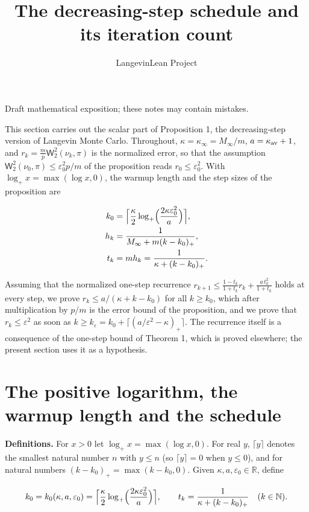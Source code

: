 \documentclass[11pt,a4paper]{article}
\title{\texorpdfstring{The decreasing-step schedule and its iteration count}{The decreasing-step schedule and its iteration count}}
\author{LangevinLean Project}
\date{}
\begin{document}
\maketitle
Draft mathematical exposition; these notes may contain mistakes.


This section carries out the scalar part of Proposition 1, the decreasing-step version of Langevin Monte Carlo. Throughout, \(\kappa=\kappa_\infty=M_\infty/m\), \(a=\kappa_{\rm av}+1\), and \(r_k=\frac mp\mathsf W_2^2(\nu_k,\pi)\) is the normalized error, so that the assumption \(\mathsf W_2^2(\nu_0,\pi)\le\varepsilon_0^2p/m\) of the proposition reads \(r_0\le\varepsilon_0^2\). With \(\log_+x=\max(\log x,0)\), the warmup length and the step sizes of the proposition are


\[\begin{aligned}
k_0&=\Bigl\lceil\frac\kappa2\log_+\Bigl(\frac{2\kappa\varepsilon_0^2}{a}\Bigr)\Bigr\rceil,\\
h_k&=\frac1{M_\infty+m(k-k_0)_+},\\
t_k&=mh_k=\frac1{\kappa+(k-k_0)_+}.
\end{aligned}\]


Assuming that the normalized one-step recurrence \(r_{k+1}\le\frac{1-t_k}{1+t_k}r_k+\frac{a\,t_k^2}{1+t_k}\) holds at every step, we prove \(r_k\le a/(\kappa+k-k_0)\) for all \(k\ge k_0\), which after multiplication by \(p/m\) is the error bound of the proposition, and we prove that \(r_k\le\varepsilon^2\) as soon as \(k\ge k_\varepsilon=k_0+\lceil(a/\varepsilon^2-\kappa)_+\rceil\). The recurrence itself is a consequence of the one-step bound of Theorem 1, which is proved elsewhere; the present section uses it as a hypothesis.


\section{\texorpdfstring{The positive logarithm, the warmup length and the schedule}{The positive logarithm, the warmup length and the schedule}}


\textbf{Definitions.} For \(x>0\) let \(\log_+x=\max(\log x,0)\). For real \(y\), \(\lceil y\rceil\) denotes the smallest natural number \(n\) with \(y\le n\) (so \(\lceil y\rceil=0\) when \(y\le0\)), and for natural numbers \((k-k_0)_+=\max(k-k_0,0)\). Given \(\kappa,a,\varepsilon_0\in\mathbb R\), define


\[k_0=k_0(\kappa,a,\varepsilon_0)=\Bigl\lceil\frac\kappa2\log_+\Bigl(\frac{2\kappa\varepsilon_0^2}{a}\Bigr)\Bigr\rceil,\qquad t_k=\frac1{\kappa+(k-k_0)_+}\quad(k\in\mathbb N).\]
\end{document}

